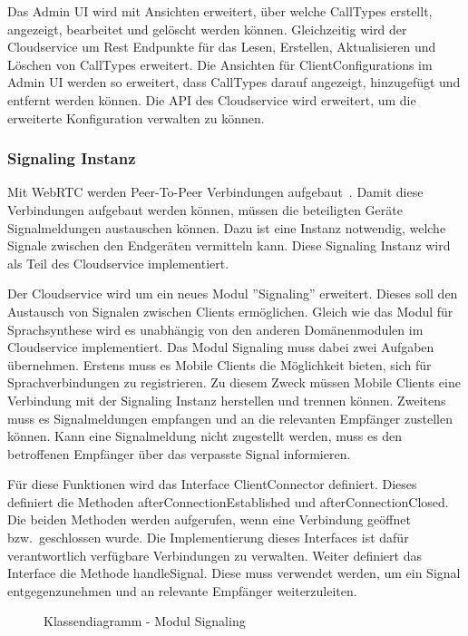 Das Admin UI wird mit Ansichten erweitert, über welche CallTypes erstellt, angezeigt, bearbeitet und gelöscht werden können.
Gleichzeitig wird der Cloudservice um Rest Endpunkte für das Lesen, Erstellen, Aktualisieren und Löschen von CallTypes erweitert.
Die Ansichten für ClientConfigurations im Admin UI werden so erweitert, dass CallTypes darauf angezeigt, hinzugefügt und entfernt werden können.
Die API des Cloudservice wird erweitert, um die erweiterte Konfiguration verwalten zu können.

\subsubsection{Signaling Instanz}

Mit WebRTC werden Peer-To-Peer Verbindungen aufgebaut~\cite{webrtc}.
Damit diese Verbindungen aufgebaut werden können, müssen die beteiligten Geräte Signalmeldungen austauschen können.
Dazu ist eine Instanz notwendig, welche Signale zwischen den Endgeräten vermitteln kann.
Diese Signaling Instanz wird als Teil des Cloudservice implementiert.

Der Cloudservice wird um ein neues Modul ''Signaling'' erweitert.
Dieses soll den Austausch von Signalen zwischen Clients ermöglichen.
Gleich wie das Modul für Sprachsynthese wird es unabhängig von den anderen Domänenmodulen im Cloudservice implementiert.
Das Modul Signaling muss dabei zwei Aufgaben übernehmen.
Erstens muss es Mobile Clients die Möglichkeit bieten, sich für Sprachverbindungen zu registrieren.
Zu diesem Zweck müssen Mobile Clients eine Verbindung mit der Signaling Instanz herstellen und trennen können.
Zweitens muss es Signalmeldungen empfangen und an die relevanten Empfänger zustellen können.
Kann eine Signalmeldung nicht zugestellt werden, muss es den betroffenen Empfänger über das verpasste Signal informieren.

Für diese Funktionen wird das Interface ClientConnector definiert.
Dieses definiert die Methoden afterConnectionEstablished und afterConnectionClosed.
Die beiden Methoden werden aufgerufen, wenn eine Verbindung geöffnet bzw.\ geschlossen wurde.
Die Implementierung dieses Interfaces ist dafür verantwortlich verfügbare Verbindungen zu verwalten.
Weiter definiert das Interface die Methode handleSignal.
Diese muss verwendet werden, um ein Signal entgegenzunehmen und an relevante Empfänger weiterzuleiten.

\begin{figure}[h]
    \centering
    \begin{minipage}[b]{1\textwidth}
        \caption{Klassendiagramm - Modul Signaling}
    \end{minipage}
\end{figure}

